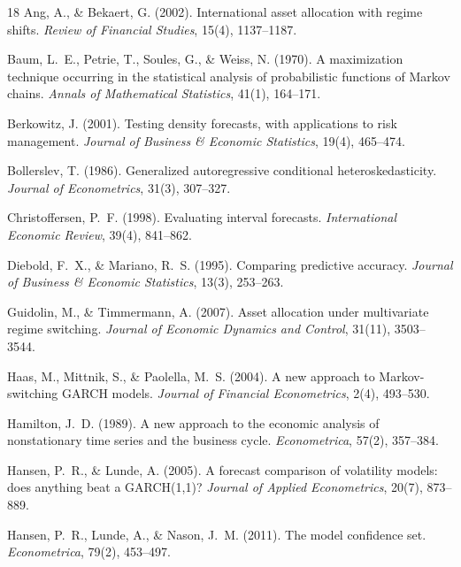 \documentclass[11pt]{article}
\begin{document}
\begin{thebibliography}{18}
Ang, A., \& Bekaert, G. (2002). International asset allocation with
regime shifts. \emph{Review of Financial Studies}, 15(4), 1137--1187.

Baum, L.~E., Petrie, T., Soules, G., \& Weiss, N. (1970). A maximization
technique occurring in the statistical analysis of probabilistic functions
of Markov chains. \emph{Annals of Mathematical Statistics}, 41(1), 164--171.

Berkowitz, J. (2001). Testing density forecasts, with applications to risk
management. \emph{Journal of Business \& Economic Statistics}, 19(4),
465--474.

Bollerslev, T. (1986). Generalized autoregressive conditional
heteroskedasticity. \emph{Journal of Econometrics}, 31(3), 307--327.

Christoffersen, P.~F. (1998). Evaluating interval forecasts.
\emph{International Economic Review}, 39(4), 841--862.

Diebold, F.~X., \& Mariano, R.~S. (1995). Comparing predictive accuracy.
\emph{Journal of Business \& Economic Statistics}, 13(3), 253--263.

Guidolin, M., \& Timmermann, A. (2007). Asset allocation under multivariate
regime switching. \emph{Journal of Economic Dynamics and Control}, 31(11),
3503--3544.

Haas, M., Mittnik, S., \& Paolella, M.~S. (2004). A new approach to
Markov-switching GARCH models. \emph{Journal of Financial Econometrics},
2(4), 493--530.

Hamilton, J.~D. (1989). A new approach to the economic analysis of
nonstationary time series and the business cycle. \emph{Econometrica},
57(2), 357--384.

Hansen, P.~R., \& Lunde, A. (2005). A forecast comparison of volatility
models: does anything beat a GARCH(1,1)? \emph{Journal of Applied
Econometrics}, 20(7), 873--889.

Hansen, P.~R., Lunde, A., \& Nason, J.~M. (2011). The model confidence
set. \emph{Econometrica}, 79(2), 453--497.


\end{thebibliography}
\end{document}
